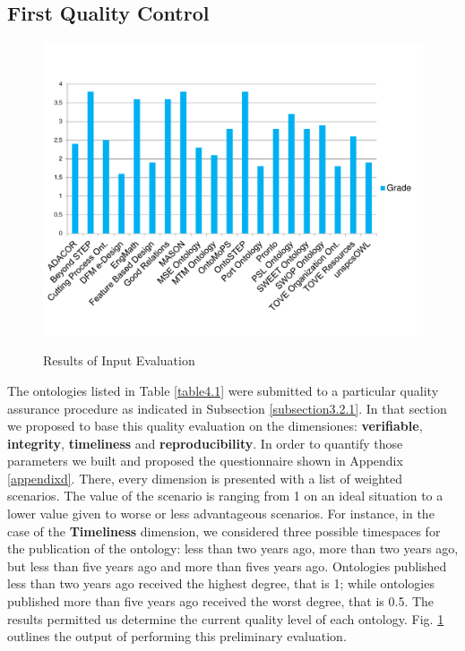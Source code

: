 \subsection{First Quality Control}\label{subsection4.2.2}

\begin{figure}
	\begin{center}
		\includegraphics[scale=0.5]{figure-chapterIV/fig4-1.pdf}\\
		\caption{Results of Input Evaluation}
		\label{figure4-1}
	\end{center}
\end{figure}

\cbstart The ontologies listed in Table \ref{table4.1} were submitted to a particular quality assurance procedure as indicated in Subsection \ref{subsection3.2.1}. In that section we proposed to base this quality evaluation on the dimensiones: \textbf{verifiable}, \textbf{integrity},  \textbf{timeliness} and \textbf{reproducibility}. In order to quantify those parameters we built and proposed the questionnaire   shown in Appendix \ref{appendixd}. There, every dimension is presented with a list of weighted scenarios. The value of the scenario is ranging from 1 on an ideal situation to a lower value given to worse or less advantageous scenarios. For instance, in the case of the \textbf{Timeliness} dimension, we considered three possible timespaces for the publication of the ontology: less than two years ago, more than two years ago, but less than five years ago and more than fives years ago. Ontologies published less than two years ago received the highest degree, that is 1; while ontologies published more than five years ago received the worst degree, that is 0.5. The results permitted us determine the current quality level of each ontology. Fig. \ref{figure4-1} outlines the output of performing this preliminary evaluation. \cbend 


